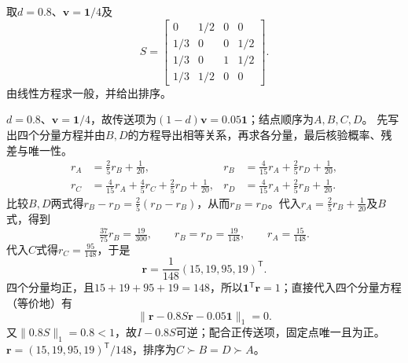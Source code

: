 \begin{example}\label{exm:V5-C07-damped-four}
取$d=0.8$、$\boldsymbol v=\boldsymbol1/4$及
\[
S=\begin{bmatrix}
0&1/2&0&0\\1/3&0&0&1/2\\1/3&0&1&1/2\\1/3&1/2&0&0
\end{bmatrix}.
\]
由线性方程求一般\PageRank{}，并给出排序。
\end{example}
\begin{solution}
\SolGiven $d=0.8$、$\boldsymbol v=\boldsymbol1/4$，故传送项为$(1-d)\boldsymbol v=0.05\boldsymbol1$；结点顺序为$A,B,C,D$。
\SolPlan 先写出四个分量方程并由$B,D$的方程导出相等关系，再求各分量，最后核验概率、残差与唯一性。
\SolDerive
\[
\begin{aligned}
r_A&=\tfrac25r_B+\tfrac1{20}, &
r_B&=\tfrac4{15}r_A+\tfrac25r_D+\tfrac1{20},\\
r_C&=\tfrac4{15}r_A+\tfrac45r_C+\tfrac25r_D+\tfrac1{20}, &
r_D&=\tfrac4{15}r_A+\tfrac25r_B+\tfrac1{20}.
\end{aligned}
\]
比较$B,D$两式得$r_B-r_D=\tfrac25(r_D-r_B)$，从而$r_B=r_D$。代入$r_A=\tfrac25r_B+\tfrac1{20}$及$B$式，得到
\[
\tfrac{37}{75}r_B=\tfrac{19}{300},\qquad
r_B=r_D=\tfrac{19}{148},\qquad r_A=\tfrac{15}{148}.
\]
代入$C$式得$r_C=\tfrac{95}{148}$，于是
\[
\boldsymbol r=\frac1{148}(15,19,95,19)^{\mathsf T}.
\]
\SolCheck 四个分量均正，且$15+19+95+19=148$，所以$\boldsymbol1^{\mathsf T}\boldsymbol r=1$；直接代入四个分量方程（等价地）有
\[
\|\boldsymbol r-0.8S\boldsymbol r-0.05\boldsymbol1\|_1=0.
\]
又$\|0.8S\|_1=0.8<1$，故$I-0.8S$可逆；配合正传送项，固定点唯一且为正。
\SolAnswer $\boldsymbol r=(15,19,95,19)^{\mathsf T}/148$，排序为$C\succ B=D\succ A$。
\end{solution}

